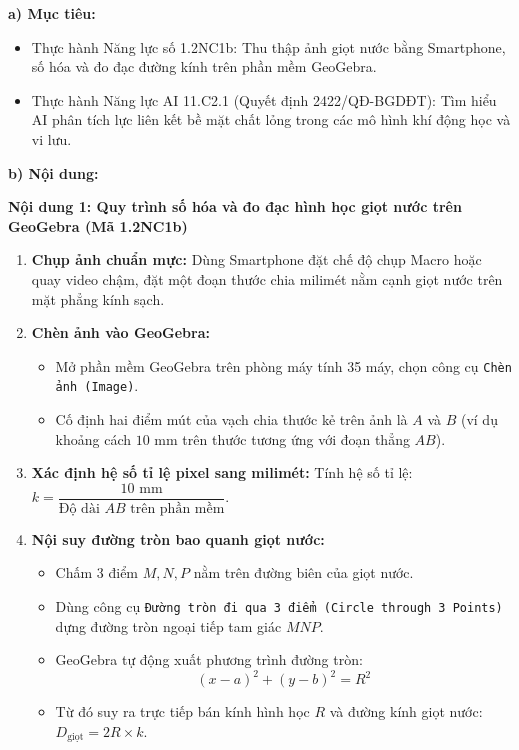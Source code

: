 \documentclass[12pt, a4paper]{article}
\begin{document}
\noindent \textbf{a) Mục tiêu:}
\begin{itemize}
    \item Thực hành Năng lực số 1.2NC1b: Thu thập ảnh giọt nước bằng Smartphone, số hóa và đo đạc đường kính trên phần mềm GeoGebra.
    \item Thực hành Năng lực AI 11.C2.1 (Quyết định 2422/QĐ-BGDĐT): Tìm hiểu AI phân tích lực liên kết bề mặt chất lỏng trong các mô hình khí động học và vi lưu.
\end{itemize}

\noindent \textbf{b) Nội dung:}

\noindent \textbf{Nội dung 1: Quy trình số hóa và đo đạc hình học giọt nước trên GeoGebra (Mã 1.2NC1b)}
\begin{enumerate}
    \item \textbf{Chụp ảnh chuẩn mực:} Dùng Smartphone đặt chế độ chụp Macro hoặc quay video chậm, đặt một đoạn thước chia milimét nằm cạnh giọt nước trên mặt phẳng kính sạch.
    \item \textbf{Chèn ảnh vào GeoGebra:}
    \begin{itemize}
        \item Mở phần mềm GeoGebra trên phòng máy tính 35 máy, chọn công cụ \texttt{Chèn ảnh (Image)}.
        \item Cố định hai điểm mút của vạch chia thước kẻ trên ảnh là $A$ và $B$ (ví dụ khoảng cách $10\text{ mm}$ trên thước tương ứng với đoạn thẳng $AB$).
    \end{itemize}
    \item \textbf{Xác định hệ số tỉ lệ pixel sang milimét:}
    Tính hệ số tỉ lệ: $k = \dfrac{10\text{ mm}}{\text{Độ dài } AB \text{ trên phần mềm}}$.
    \item \textbf{Nội suy đường tròn bao quanh giọt nước:}
    \begin{itemize}
        \item Chấm 3 điểm $M, N, P$ nằm trên đường biên của giọt nước.
        \item Dùng công cụ \texttt{Đường tròn đi qua 3 điểm (Circle through 3 Points)} dựng đường tròn ngoại tiếp tam giác $MNP$.
        \item GeoGebra tự động xuất phương trình đường tròn:
        $$(x - a)^2 + (y - b)^2 = R^2$$
        \item Từ đó suy ra trực tiếp bán kính hình học $R$ và đường kính giọt nước: $D_{\text{giọt}} = 2R \times k$.
    \end{itemize}
\end{enumerate}
\end{document}
